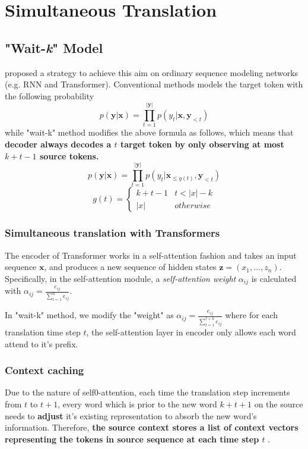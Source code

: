 \documentclass[a3paper, 12pt]{book} %
\newcommand\bolden[1]{{\boldmath\bfseries#1}}
\begin{document}
\section{Simultaneous Translation}
\subsection{"Wait-\emph{k}" Model}
\citep{ma2018stacl} proposed a strategy to achieve this aim on ordinary sequence modeling networks (e.g. RNN and Transformer). Conventional methods models the target token with the following probability 
\begin{equation}
p(\mathbf{y}|\mathbf{x})=\prod_{t=1}^{|\mathbf{y}|}{p(y_t|\mathbf{x}, \mathbf{y}_{<t})}
\end{equation}
while "wait-k" method modifies the above formula as follows, which means that \bolden{decoder always decodes a $t$ target token by only observing at most  $k+t-1$ source tokens.}
\begin{equation}
p(\mathbf{y}|\mathbf{x})=\prod_{t=1}^{|\mathbf{y}|}{p(y_t|\mathbf{x}_{\le g(t)}, \mathbf{y}_{<t})}
\end{equation}
\begin{equation}
g(t)=
\left\{
\begin{array}{lr}
k+t-1 &  t < |x| - k\\
|x|& otherwise  
\end{array}
\right.
\end{equation}

\subsubsection{Simultaneous translation with Transformers}
The encoder of Transformer works in a self-attention fashion and takes an input sequence $\mathbf{x}$, and produces a new sequence of hidden states $\mathbf{z}=(x_1,...,z_n) $. Specifically, in the self-attention module, a \emph{self-attention weight} $\alpha_{ij}$ is calculated with $\alpha_{ij}= \frac{e_{ij}}{\sum_{l=1}^{n}{e_{ij}}}$.

In "wait-k" method, we modify the "weight" as $\alpha_{ij}= \frac{e_{ij}}{\sum_{l=1}^{t+k}{e_{ij}}}$ where for each translation time step $t$, the self-attention layer in encoder only allows each word attend to it's prefix.
\subsubsection{Context caching}
Due to the nature of self0-attention, each time the translation step increments from $t$ to $t+1$, every word which is prior to the new word $k+t+1$ on the source needs to \textbf{adjust} it's existing representation to absorb the new word's information. Therefore, \bolden{the source context stores a list of context vectors representing the tokens in source sequence at each time step $t$ }.
 
\end{document}
